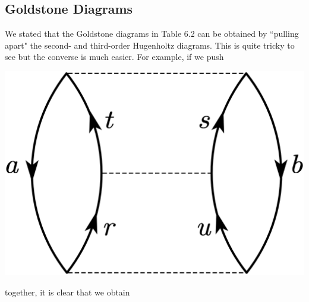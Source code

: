 \documentclass[a4paper]{book}
\newcounter{exercise}[chapter]
\begin{document}
	\subsection{Goldstone Diagrams}

	\begin{exercise}
	We stated that the Goldstone diagrams in Table 6.2 can be obtained by ``pulling apart" the second- and third-order Hugenholtz diagrams. This is quite tricky to see but the converse is much easier. For example, if we push
	
	\begin{center}
	\includegraphics[scale=1.0]{./pictures/6.12/exercise_1.png}
	\end{center}
	
	together, it is clear that we obtain
	

\end{exercise}
\end{document}
